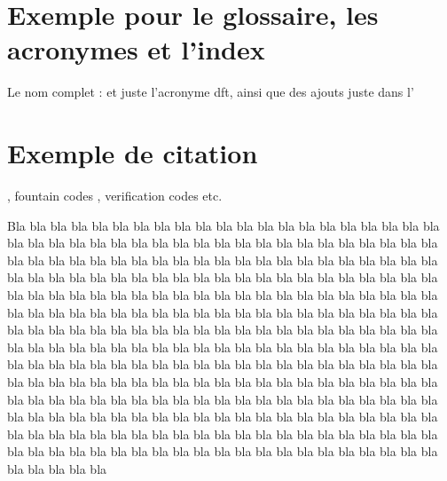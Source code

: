 \documentclass[english]{enstaPRE}
\begin{document}
\section{Exemple pour le glossaire, les acronymes et l'index}
Le nom complet :  et juste l'acronyme \ac{dft}, ainsi que des ajouts juste dans l'

\section{Exemple de citation}
 \cite{gallager1962low}, fountain codes \cite{byers1998digital,luby2002digital}, verification codes \cite{luby2002verification} etc.

Bla bla bla bla bla bla bla bla bla bla bla bla bla bla bla bla bla bla bla bla bla bla bla bla bla bla bla bla bla bla bla bla bla bla bla bla bla bla bla bla bla bla bla bla bla bla bla bla bla bla bla bla bla bla bla bla bla bla bla bla bla bla bla bla bla bla bla bla bla bla bla bla bla bla bla bla bla bla bla bla bla bla bla bla bla bla bla bla bla bla bla bla bla bla bla bla bla bla bla bla bla bla bla bla bla bla bla bla bla bla bla bla bla bla bla bla bla bla bla bla bla bla bla bla bla bla bla bla bla bla bla bla bla bla bla bla bla bla bla bla bla bla bla bla bla bla bla bla bla bla bla bla bla bla bla bla bla bla bla bla bla bla bla bla bla bla bla bla bla bla bla bla bla bla bla bla bla bla bla bla bla bla bla bla bla bla bla bla bla bla bla bla bla bla bla bla bla bla bla bla bla bla bla bla bla bla bla bla bla bla bla bla bla bla bla bla bla bla bla bla bla bla bla bla bla bla bla bla bla bla bla bla bla bla bla bla bla bla bla bla bla bla bla bla bla bla bla bla bla bla bla bla bla bla bla bla bla bla bla bla bla bla bla bla bla bla bla bla bla bla bla bla bla bla bla bla bla bla bla bla bla bla bla bla bla bla bla bla bla bla bla bla bla bla bla bla bla bla bla 


\afficheGlossaire

\afficheIndex

\listedestables

\listedesfigures
\end{document}
